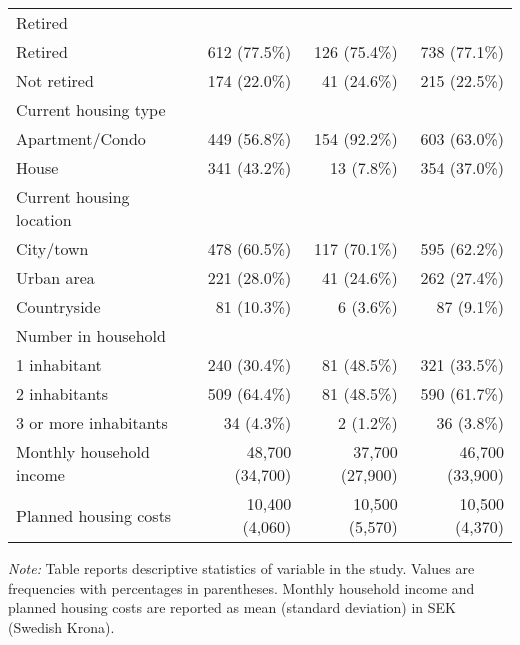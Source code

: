 \begin{table}[H]
\begin{threeparttable}
\begin{tabular}[t]{lrrr}
Retired & & & \\
\hspace{1em}Retired & 612 (77.5\%) & 126 (75.4\%) & 738 (77.1\%) \\
\hspace{1em}Not retired & 174 (22.0\%) & 41 (24.6\%) & 215 (22.5\%) \\
\addlinespace[0.6em]

Current housing type & & & \\
\hspace{1em}Apartment/Condo & 449 (56.8\%) & 154 (92.2\%) & 603 (63.0\%) \\
\hspace{1em}House & 341 (43.2\%) & 13 (7.8\%) & 354 (37.0\%) \\
\addlinespace[0.6em]

Current housing location & & & \\
\hspace{1em}City/town & 478 (60.5\%) & 117 (70.1\%) & 595 (62.2\%) \\
\hspace{1em}Urban area & 221 (28.0\%) & 41 (24.6\%) & 262 (27.4\%) \\
\hspace{1em}Countryside & 81 (10.3\%) & 6 (3.6\%) & 87 (9.1\%) \\
\addlinespace[0.6em]

Number in household & & & \\
\hspace{1em}1 inhabitant& 240 (30.4\%) & 81 (48.5\%) & 321 (33.5\%) \\
\hspace{1em}2 inhabitants & 509 (64.4\%) & 81 (48.5\%) & 590 (61.7\%) \\
\hspace{1em}3 or more inhabitants& 34 (4.3\%) & 2 (1.2\%) & 36 (3.8\%) \\
\addlinespace[0.6em]

Monthly household income & 48,700 (34,700) & 37,700 (27,900) & 46,700 (33,900) \\
Planned housing costs & 10,400 (4,060) & 10,500 (5,570) & 10,500 (4,370) \\
\bottomrule
\end{tabular}

\begin{tablenotes}[flushleft]
\scriptsize
\item \textit{Note:} Table reports descriptive statistics of variable in the study. Values are frequencies with percentages in parentheses. Monthly household income and planned housing costs are reported as mean (standard deviation) in SEK (Swedish Krona).
\end{tablenotes}
\end{threeparttable}
\end{table}
